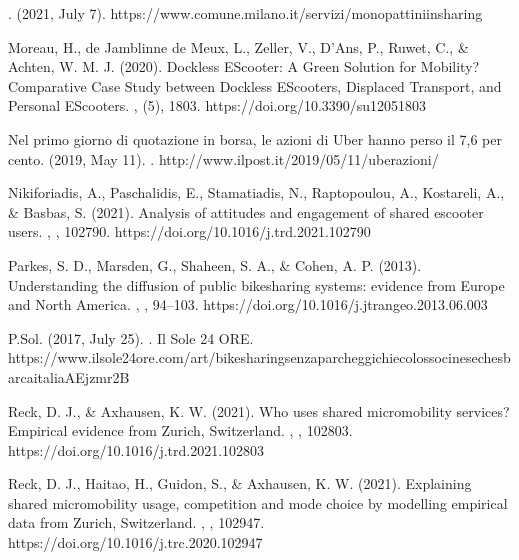 \documentclass[letterpaper,10pt,english]{jupyterBook}
\begin{document}
\sphinxAtStartPar
{}. (2021, July 7). https://www.comune.milano.it/servizi/monopattini\sphinxhyphen{}in\sphinxhyphen{}sharing

\sphinxAtStartPar
Moreau, H., de Jamblinne de Meux, L., Zeller, V., D’Ans, P., Ruwet, C., \& Achten, W. M. J. (2020). Dockless E\sphinxhyphen{}Scooter: A Green Solution for Mobility? Comparative Case Study between Dockless E\sphinxhyphen{}Scooters, Displaced Transport, and Personal E\sphinxhyphen{}Scooters. , (5), 1803. https://doi.org/10.3390/su12051803

\sphinxAtStartPar
Nel primo giorno di quotazione in borsa, le azioni di Uber hanno perso il 7,6 per cento. (2019, May 11). . http://www.ilpost.it/2019/05/11/uber\sphinxhyphen{}azioni/

\sphinxAtStartPar
Nikiforiadis, A., Paschalidis, E., Stamatiadis, N., Raptopoulou, A., Kostareli, A., \& Basbas, S. (2021). Analysis of attitudes and engagement of shared e\sphinxhyphen{}scooter users. , , 102790. https://doi.org/10.1016/j.trd.2021.102790

\sphinxAtStartPar
Parkes, S. D., Marsden, G., Shaheen, S. A., \& Cohen, A. P. (2013). Understanding the diffusion of public bikesharing systems: evidence from Europe and North America. , , 94–103. https://doi.org/10.1016/j.jtrangeo.2013.06.003

\sphinxAtStartPar
P.Sol. (2017, July 25). . Il Sole 24 ORE. https://www.ilsole24ore.com/art/bike\sphinxhyphen{}sharing\sphinxhyphen{}senza\sphinxhyphen{}parcheggi\sphinxhyphen{}chi\sphinxhyphen{}e\sphinxhyphen{}colosso\sphinxhyphen{}cinese\sphinxhyphen{}che\sphinxhyphen{}sbarca\sphinxhyphen{}italia\sphinxhyphen{}AEjzmr2B

\sphinxAtStartPar
Reck, D. J., \& Axhausen, K. W. (2021). Who uses shared micro\sphinxhyphen{}mobility services? Empirical evidence from Zurich, Switzerland. , , 102803. https://doi.org/10.1016/j.trd.2021.102803

\sphinxAtStartPar
Reck, D. J., Haitao, H., Guidon, S., \& Axhausen, K. W. (2021). Explaining shared micromobility usage, competition and mode choice by modelling empirical data from Zurich, Switzerland. , , 102947. https://doi.org/10.1016/j.trc.2020.102947
\end{document}
